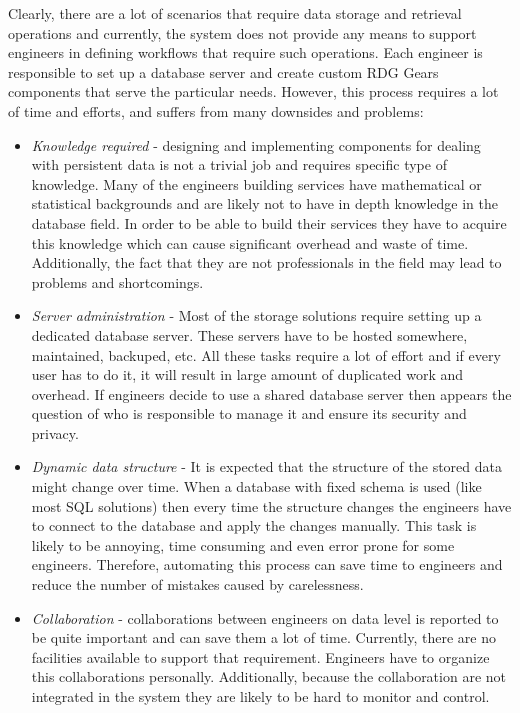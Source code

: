 Clearly, there are a lot of scenarios that require data storage and retrieval operations and currently, the system does not provide any means to support engineers in defining workflows that require such operations. Each engineer is responsible to set up a database server and create custom RDG Gears components that serve the particular needs. However, this process requires a lot of time and efforts, and suffers from many downsides and problems:

\begin{itemize}
	\item \textit{Knowledge required} - designing and implementing components for dealing with persistent data is not a trivial job and requires specific type of knowledge. Many of the engineers building services have mathematical or statistical backgrounds and are likely not to have in depth knowledge in the database field. In order to be able to build their services they have to acquire this knowledge which can cause significant overhead and waste of time. Additionally, the fact that they are not professionals in the field may lead to problems and shortcomings.
	
	\item \textit{Server administration} - Most of the storage solutions require setting up a dedicated database server. These servers have to be hosted somewhere, maintained, backuped, etc. All these tasks require a lot of effort and if every user has to do it, it will result in large amount of duplicated work and overhead. If engineers decide to use a shared database server then appears the question of who is responsible to manage it and ensure its security and privacy.
	
	\item \textit{Dynamic data structure} - It is expected that the structure of the stored data might change over time. When a database with fixed schema is used (like most SQL solutions) then every time the structure changes the engineers have to connect to the database and apply the changes manually. This task is likely to be annoying, time consuming and even error prone for some engineers. Therefore, automating this process can save time to engineers and reduce the number of mistakes caused by carelessness. 
	
	\item \textit{Collaboration} - collaborations between engineers on data level is reported to be quite important and can save them a lot of time. Currently, there are no facilities available to support that requirement. Engineers have to organize this collaborations personally. Additionally, because the collaboration are not integrated in the system they are likely to be hard to monitor and control.
	

\end{itemize}
